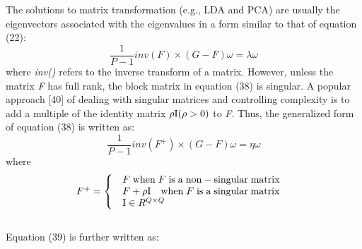 \documentclass[journal]{IEEEtran}
\begin{document}
\section{}
The solutions to matrix transformation (e.g., LDA and PCA) are usually the eigenvectors associated with the eigenvalues in a form similar to that of equation (22):
\begin{equation}
\frac{1}{{P - 1}}inv(F) \times (G-F)\omega  = \lambda \omega
\end{equation}
where \textit{inv()} refers to the inverse transform of a matrix. However, unless the matrix \textit{F} has full rank, the block matrix in equation (38) is singular. A popular approach [40] of dealing with singular matrices and controlling complexity is to add a multiple of the identity matrix $\rho {\rm I}(\rho  > 0)$ to \textit{F}. Thus, the generalized form of equation (38) is written as:
\begin{equation}
\frac{1}{{P - 1}}inv({F^ + }) \times (G - {F})\omega  = \eta \omega
\end{equation}
where
\begin{equation}
\begin{array}{*{20}{c}}
   {{F^ + } = \left\{ {\begin{array}{*{20}{c}}
   {F\;   {\rm{when}}\; F\; {\rm{is}}\; {\rm{a}}\; {\rm{non-singular}}\; {\rm{matrix}}}  \\
   \begin{array}{l}
 F + \rho {\rm{I }}\quad {\rm{when}}\; F\; {\rm{is}}\; {\rm{a}}\; {\rm{singular}}\; {\rm{matrix}} \\
 {\rm{I}} \in {R^{Q \times Q}} \\
 \end{array}  \\
\end{array}} \right.}  \\

\end{array}
\end{equation}\\\indent
Equation (39) is further written as:
\end{document}
